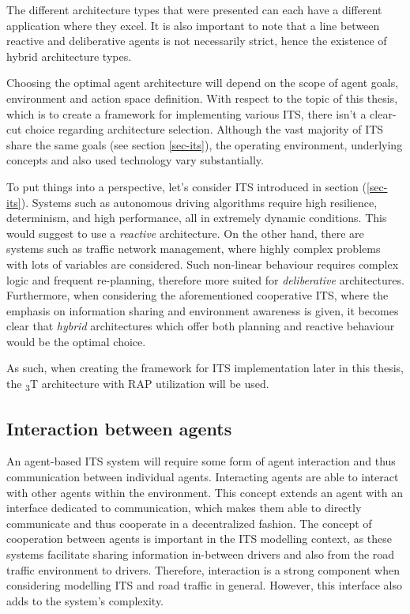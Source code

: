 \documentclass[main.tex]{subfiles}
\begin{document}
The different architecture types that were presented can each have a different application where 
they excel. It is also important to note that a line between reactive and deliberative agents 
is not necessarily strict, hence the existence of hybrid architecture types. 

Choosing the optimal agent architecture will depend on the scope of agent goals, 
environment and action space definition. With respect to the topic of this thesis, which is to 
create a framework for implementing various ITS, there isn't a clear-cut choice regarding 
architecture selection. Although the vast majority of ITS share the same goals (see section \ref{sec-its}), 
the operating environment, underlying concepts and also used technology vary substantially.

To put things into a perspective, let's consider ITS introduced in section (\ref{sec-its}). 
Systems such as autonomous driving algorithms require high resilience, determinism, 
and high performance, all in extremely dynamic conditions. This would suggest to use a
\emph{reactive} architecture. On the other hand, there are systems such as traffic network management, 
where highly complex problems with lots of variables are considered. Such non-linear behaviour 
requires complex logic and frequent re-planning, therefore more suited for \emph{deliberative}
architectures. Furthermore, when considering the aforementioned cooperative ITS, where the emphasis 
on information sharing and environment awareness is given, it becomes clear that \emph{hybrid} 
architectures which offer both planning and reactive behaviour would be the optimal choice.

As such, when creating the framework for ITS implementation later in this thesis, the
\textsubscript{3}T architecture with RAP utilization will be used.  

\subsection{Interaction between agents}\label{mas-interaction}

An agent-based ITS system will require some form of agent interaction and
thus communication between individual agents. Interacting agents are able to interact with
other agents within the environment. This concept extends an agent with an interface dedicated
to communication, which makes them able to directly communicate and thus cooperate in a
decentralized fashion.  The concept of cooperation between agents is important in the ITS
modelling context, as these systems facilitate sharing information in-between drivers and also
from the road traffic environment to drivers. Therefore, interaction is a strong component when
considering modelling ITS and road traffic in general. However, this interface also adds to the
system's complexity.
\end{document}
